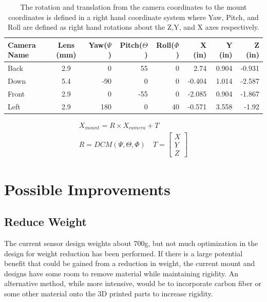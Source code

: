 \begin{table}[htbp]
	\centering
	\caption{The rotation and translation from the camera coordinates to the mount coordinates is defined in a right hand coordinate system where Yaw, Pitch, and Roll are defined as right hand rotations about the Z,Y, and X axes respectively.}
	\begin{tabular}{lcrrrrrr}
		\toprule
		Camera Name & Lens (mm) & Yaw($\Psi $) & Pitch($\Theta$) & Roll($\Phi$) & X (in) & Y (in) & Z (in) \\
		\midrule
		\multicolumn{1}{l}{Back} & 2.9   & 0\degree     & 55\degree    & 0\degree     & 2.74 & 0.904 & -0.931 \\
		\multicolumn{1}{l}{Down} & 5.4   & -90\degree   & 0\degree     & 0\degree     & -0.404 & 1.014 & -2.587 \\
		\multicolumn{1}{l}{Front} & 2.9   & 0\degree     & -55\degree   & 0\degree     & -2.085 & 0.904 & -1.867 \\
		\multicolumn{1}{l}{Left} & 2.9   & 180\degree   & 0\degree     & 40\degree    & -0.571 & 3.558 & -1.92 \\
		\bottomrule
	\end{tabular}%
	\label{tab:imRotations}%
\end{table}%
\begin{align}
\label{eqn:rot}
X_{mount} = R\times X_{camera} + T \\ 
\nonumber
R = DCM(\Psi,\Theta,\Phi)
\quad
T = \begin{bmatrix}
X \\ Y \\ Z
\end{bmatrix}
\end{align}

	\section{Possible Improvements}
	\subsection{Reduce Weight}
	The current sensor design weights about 700g, but not much optimization in the design for weight reduction has been performed.  If there is a large potential benefit that could be gained from a reduction in weight, the current mount and designs have some room to remove material while maintaining rigidity.  An alternative method, while more intensive, would be to incorporate carbon fiber or some other material onto the 3D printed parts to increase rigidity.  
